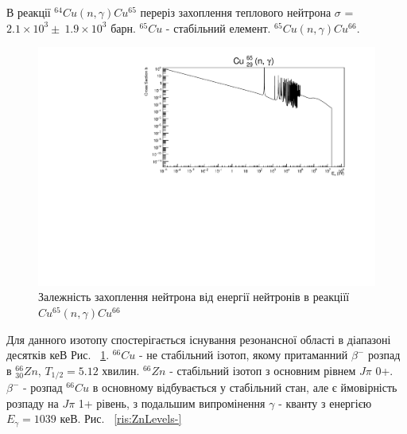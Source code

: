 \documentclass[a4paper, 14pt]{article}
\numberwithin{equation}{section}
\numberwithin{table}{section}
\begin{document}
В реакції $^{64}Cu(n, \gamma)Cu^{65}$ переріз захоплення теплового нейтрона $\sigma$ = $2.1 \times 10^3 \pm \ 1.9 \times 10^3$ барн. $^{65}Cu$ - стабільний елемент. $^{65}Cu(n,\gamma)Cu^{66}$.
\begin{figure}[hbt!]
	\centering \includegraphics[width=1\textwidth]{sigma/Cu65Sigma.pdf}
	\caption{Залежність захоплення нейтрона від енергії нейтронів в реакціїї  $Cu^{65}(n,\gamma)Cu^{66}$} 
	\label{ris:CuSigma}	
\end{figure} 
Для данного изотопу спостерігається існування резонансної області в діапазоні десятків кеВ Рис. ~\ref{ris:CuSigma}. 
$^{66}Cu$ - не стабільний ізотоп, якому притаманний $\beta^-$ розпад в $^{66}_{30}Zn$, $T_{1/2} = 5.12$ хвилин. 
$^{66}Zn$ - стабільний ізотоп з основним рівнем $J\pi$ 0+. $\beta^-$ - розпад $^{66}Cu$ в основному відбувається у стабільний стан, але є ймовірність розпаду на $J\pi$ 1+ рівень, з подальшим випромінення $\gamma$ - кванту з енергією $E_{\gamma} = 1039$ кеВ. Рис. ~\ref{ris:ZnLevels-}
\\
\end{document}
